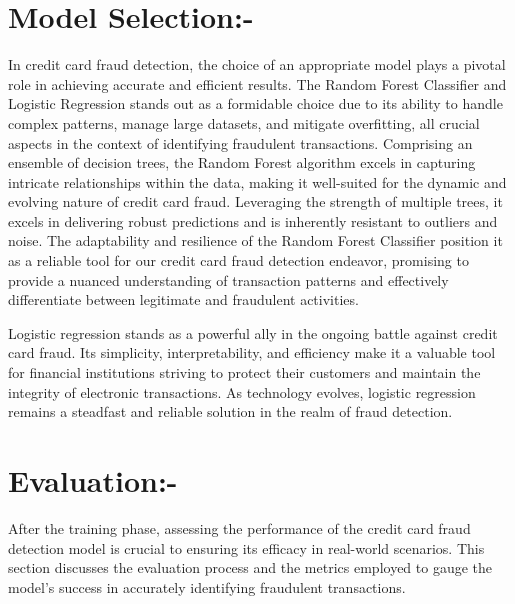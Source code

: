 \section{Model Selection:-} In credit card fraud detection, the choice of an appropriate model plays a pivotal role in achieving accurate and efficient results. The Random Forest Classifier and Logistic Regression stands out as a formidable choice due to its ability to handle complex patterns, manage large datasets, and mitigate overfitting, all crucial aspects in the context of identifying fraudulent transactions. Comprising an ensemble of decision trees, the Random Forest algorithm excels in capturing intricate relationships within the data, making it well-suited for the dynamic and evolving nature of credit card fraud. Leveraging the strength of multiple trees, it excels in delivering robust predictions and is inherently resistant to outliers and noise. The adaptability and resilience of the Random Forest Classifier position it as a reliable tool for our credit card fraud detection endeavor, promising to provide a nuanced understanding of transaction patterns and effectively differentiate between legitimate and fraudulent activities.\medskip

Logistic regression stands as a powerful ally in the ongoing battle against credit card fraud. Its simplicity, interpretability, and efficiency make it a valuable tool for financial institutions striving to protect their customers and maintain the integrity of electronic transactions. As technology evolves, logistic regression remains a steadfast and reliable solution in the realm of fraud detection.

\section{Evaluation:-} After the training phase, assessing the performance of the credit card fraud detection model is crucial to ensuring its efficacy in real-world scenarios. This section discusses the evaluation process and the metrics employed to gauge the model's success in accurately identifying fraudulent transactions.

